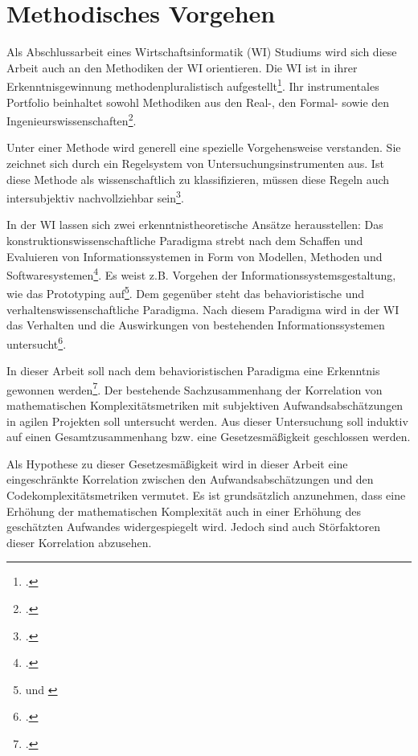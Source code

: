 \section{Methodisches Vorgehen}\label{methodisches-vorgehen}

Als Abschlussarbeit eines Wirtschaftsinformatik (WI) Studiums wird sich
diese Arbeit auch an den Methodiken der WI orientieren. Die WI ist in
ihrer Erkenntnisgewinnung methodenpluralistisch aufgestellt\footcite[Vgl. ][S. 1]{wildeMethodenspektrumWirtschaftsinformatikUberblick2006}. Ihr instrumentales Portfolio beinhaltet
sowohl Methodiken aus den Real-, den Formal- sowie den
Ingenieurswissenschaften\footcite[Vgl. ][S. 1]{wildeMethodenspektrumWirtschaftsinformatikUberblick2006}.

Unter einer Methode wird generell eine spezielle Vorgehensweise
verstanden. Sie zeichnet sich durch ein Regelsystem von
Untersuchungsinstrumenten aus. Ist diese Methode als wissenschaftlich zu
klassifizieren, müssen diese Regeln auch intersubjektiv nachvollziehbar
sein\footcite[Vgl. ][S. 1f]{wildeMethodenspektrumWirtschaftsinformatikUberblick2006}.

In der WI lassen sich zwei erkenntnistheoretische Ansätze herausstellen:
Das konstruktionswissenschaftliche Paradigma strebt nach dem Schaffen
und Evaluieren von Informationssystemen in Form von Modellen, Methoden
und Softwaresystemen\footcite[Vgl. ][S. 2]{wildeMethodenspektrumWirtschaftsinformatikUberblick2006}. Es weist z.B.
Vorgehen der Informationssystemsgestaltung, wie das Prototyping
auf\footnote{\cite[Vgl. ][S. 3]{wildeMethodenspektrumWirtschaftsinformatikUberblick2006} und \cite{simonSciencesArtificial2019}}. Dem gegenüber steht das
behavioristische und verhaltenswissenschaftliche Paradigma. Nach diesem
Paradigma wird in der WI das Verhalten und die Auswirkungen von
bestehenden Informationssystemen untersucht\footcite[Vgl. ][S. 3]{wildeMethodenspektrumWirtschaftsinformatikUberblick2006}.

In dieser Arbeit soll nach dem behavioristischen Paradigma eine
Erkenntnis gewonnen werden\footcite[Vgl. ][S. 3]{wildeMethodenspektrumWirtschaftsinformatikUberblick2006}. Der
bestehende Sachzusammenhang der Korrelation von mathematischen
Komplexitätsmetriken mit subjektiven Aufwandsabschätzungen in agilen
Projekten soll untersucht werden. Aus dieser Untersuchung soll induktiv
auf einen Gesamtzusammenhang bzw. eine Gesetzesmäßigkeit geschlossen
werden.

Als Hypothese zu dieser Gesetzesmäßigkeit wird in dieser Arbeit eine
eingeschränkte Korrelation zwischen den Aufwandsabschätzungen und den
Codekomplexitätsmetriken vermutet. Es ist grundsätzlich anzunehmen, dass
eine Erhöhung der mathematischen Komplexität auch in einer Erhöhung des
geschätzten Aufwandes widergespiegelt wird. Jedoch sind auch
Störfaktoren dieser Korrelation abzusehen.

